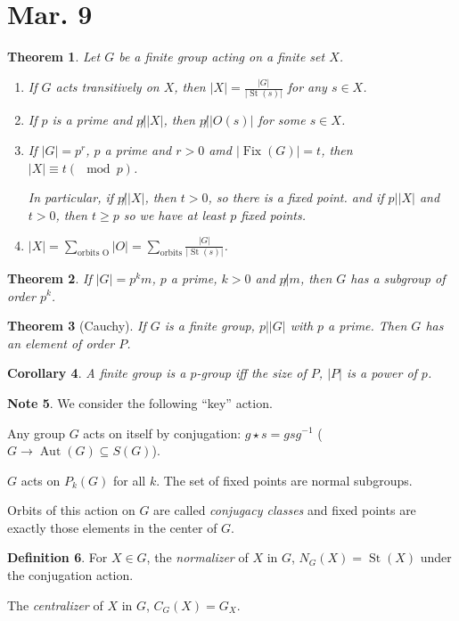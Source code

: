 \documentclass{amsart}
\newtheorem{thm}{Theorem}[section]
\newtheorem{cor}[thm]{Corollary}
\theoremstyle{definition}
\newtheorem{definition}[thm]{Definition}
\newtheorem{note}[thm]{Note}
\DeclareMathOperator{\Aut}{Aut}
\DeclareMathOperator{\St}{St}
\DeclareMathOperator{\Fix}{Fix}
\begin{document}
\section{Mar. 9}
\begin{thm}
	Let $G$ be a finite group acting on a finite set $X$.
	\begin{enumerate}
		\item If $G$ acts transitively on $X$, then $|X|=\frac{|G|}{|\St(s)|}$ for any $s\in X$.
		\item If $p$ is a prime and $p\not||X|$, then $p\not||O(s)|$ for some $s\in X$.
		\item If $|G|=p^r$, $p$ a prime and $r>0$ amd $|\Fix(G)|=t$, then $|X|\equiv t(\mod p)$.
	
	In particular, if $p\not||X|$, then $t>0$, so there is a fixed point. and if $p||X|$ and $t>0$, then $t\geq p$ so we have at least $p$ fixed points.
		\item $|X|=\sum_{\text{orbits O}}|O|=\sum_{\text{orbits}}\frac{|G|}{|\St(s)|}$.
		\end{enumerate}
\end{thm}
\begin{thm}
	If $|G|=p^km$, $p$ a prime, $k>0$ and $p\not|m$, then $G$ has a subgroup of order $p^k$.
\end{thm}
\begin{thm}[Cauchy]
	If $G$ is a finite group, $p||G|$ with $p$ a prime. Then $G$ has an element of order $P$.
\end{thm}
\begin{cor}
	A finite group is a $p$-group iff the size of $P$, $|P|$ is a power of $p$.
\end{cor}
\begin{note}
	We consider the following ``key'' action.
	
	Any group $G$ acts on itself by conjugation: $g\star s=gsg^{-1}$ ($G\to \Aut(G)\subseteq S(G)$).
	
	$G$ acts on $P_{k}(G)$ for all $k$. The set of fixed points are normal subgroups. 
	
	Orbits of this action on $G$ are called \emph{conjugacy classes} and fixed points are exactly those elements in the center of $G$.
\end{note}
\begin{definition}
	For $X\in G$, the \emph{normalizer} of $X$ in $G$, $N_G(X)=\St(X)$ under the conjugation action.
	
	The \emph{centralizer} of $X$ in $G$, $C_G(X)=G_X$.
\end{definition}
\end{document}
